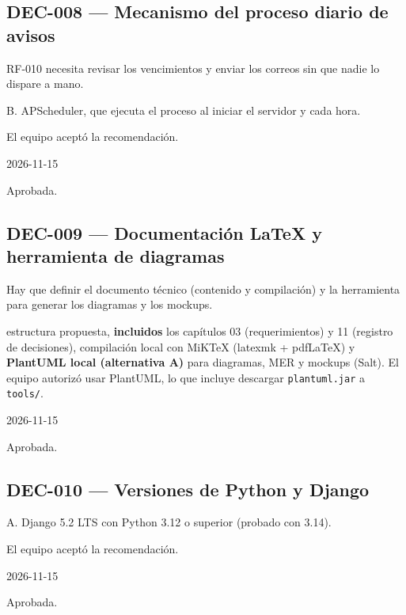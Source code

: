 \subsection{DEC-008 — Mecanismo del proceso diario de avisos}
\begin{description}[style=nextline]
  \item[Problema] RF-010 necesita revisar los vencimientos y enviar los correos sin que nadie lo dispare a mano.
  \item[Decisión seleccionada] B. APScheduler, que ejecuta el proceso al iniciar el servidor y cada hora.
  \item[Justificación] El equipo aceptó la recomendación.
  \item[Fecha] 2026-11-15
  \item[Estado] Aprobada.
\end{description}
\subsection{DEC-009 — Documentación LaTeX y herramienta de diagramas}
\begin{description}[style=nextline]
  \item[Problema] Hay que definir el documento técnico (contenido y compilación) y la herramienta para generar los diagramas y los mockups.
  \item[Decisión seleccionada] estructura propuesta, \textbf{incluidos} los capítulos 03 (requerimientos) y 11 (registro de decisiones), compilación local con MiKTeX (latexmk + pdfLaTeX) y \textbf{PlantUML local (alternativa A)} para diagramas, MER y mockups (Salt). El equipo autorizó usar PlantUML, lo que incluye descargar \texttt{plantuml.jar} a \texttt{tools/}.
  \item[Fecha] 2026-11-15
  \item[Estado] Aprobada.
\end{description}
\subsection{DEC-010 — Versiones de Python y Django}
\begin{description}[style=nextline]
  \item[Decisión seleccionada] A. Django 5.2 LTS con Python 3.12 o superior (probado con 3.14).
  \item[Justificación] El equipo aceptó la recomendación.
  \item[Fecha] 2026-11-15
  \item[Estado] Aprobada.
\end{description}
